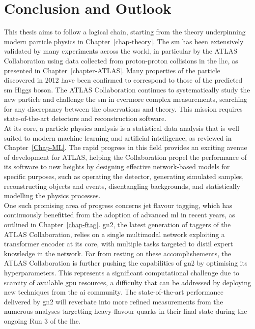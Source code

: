 \chapter{\color{oxfordblue} Conclusion and Outlook}\label{chap-Conclusion}
\ChapFrame
\vspace{-1cm}
This thesis aims to follow a logical chain, starting from the theory underpinning modern particle physics in Chapter~\ref{chap-theory}. The \gls{sm} has been extensively validated by many experiments across the world, in particular by the ATLAS Collaboration using data collected from proton-proton collisions in the \gls{lhc}, as presented in Chapter~\ref{chapter-ATLAS}. Many properties of the particle discovered in 2012 have been confirmed to correspond to those of the predicted \gls{sm} Higgs boson. The ATLAS Collaboration continues to systematically study the new particle and challenge the \gls{sm} in evermore complex measurements, searching for any discrepancy between the observations and theory. This mission requires state-of-the-art detectors and reconstruction software. \\

At its core, a particle physics analysis is a statistical data analysis that is well suited to modern machine learning and artificial intelligence, as reviewed in Chapter~\ref{Chap-ML}. The rapid progress in this field provides an exciting avenue of development for ATLAS, helping the Collaboration propel the performance of its software to new heights by designing effective network-based models for specific purposes, such as operating the detector, generating simulated samples, reconstructing objects and events, disentangling backgrounds, and statistically modelling the physics processes. \\

One such promising area of progress concerns jet flavour tagging, which has continuously benefitted from the adoption of advanced \gls{ml} in recent years, as outlined in Chapter~\ref{chap-ftag}. \gls{gn2}, the latest generation of taggers of the ATLAS Collaboration, relies on a single multimodal network exploiting a transformer encoder at its core, with multiple tasks targeted to distil expert knowledge in the network. Far from resting on these accomplishements, the ATLAS Collaboration is further pushing the capabilities of \gls{gn2} by optimising its hyperparameters. This represents a significant computational challenge due to scarcity of available \gls{gpu} resources, a difficulty that can be addressed by deploying new techniques from the \gls{ai} community. The state-of-the-art performance delivered by \gls{gn2} will reverbate into more refined measurements from the numerous analyses targetting heavy-flavour quarks in their final state during the ongoing Run 3 of the \gls{lhc}.  \\


